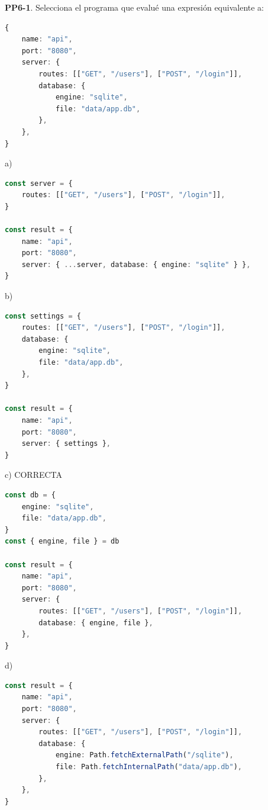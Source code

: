 \textbf{PP6-1}. Selecciona el programa que evalué una expresión equivalente a:

\begin{bloquecodigo}
\begin{lstlisting}[language=TypeScript]
{
    name: "api",
    port: "8080",
    server: {
        routes: [["GET", "/users"], ["POST", "/login"]],
        database: {
            engine: "sqlite",
            file: "data/app.db",
        },
    },
}
\end{lstlisting}
\end{bloquecodigo}

\begin{opcion}{a)}
\begin{lstlisting}[language=TypeScript]
const server = {
    routes: [["GET", "/users"], ["POST", "/login"]],
}

const result = {
    name: "api",
    port: "8080",
    server: { ...server, database: { engine: "sqlite" } },
}
\end{lstlisting}
\end{opcion}

\begin{opcion}{b)}
\begin{lstlisting}[language=TypeScript]
const settings = {
    routes: [["GET", "/users"], ["POST", "/login"]],
    database: {
        engine: "sqlite",
        file: "data/app.db",
    },
}

const result = {
    name: "api",
    port: "8080",
    server: { settings },
}
\end{lstlisting}
\end{opcion}

\begin{opcion}{c)}
CORRECTA
\begin{lstlisting}[language=TypeScript]
const db = {
    engine: "sqlite",
    file: "data/app.db",
}
const { engine, file } = db

const result = {
    name: "api",
    port: "8080",
    server: {
        routes: [["GET", "/users"], ["POST", "/login"]],
        database: { engine, file },
    },
}
\end{lstlisting}
\end{opcion}

\begin{opcion}{d)}
\begin{lstlisting}[language=TypeScript]
const result = {
    name: "api",
    port: "8080",
    server: {
        routes: [["GET", "/users"], ["POST", "/login"]],
        database: {
            engine: Path.fetchExternalPath("/sqlite"),
            file: Path.fetchInternalPath("data/app.db"),
        },
    },
}
\end{lstlisting}
\end{opcion}

